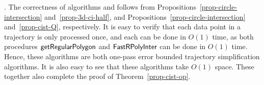 {.
%
The correctness of algorithms \cist and \cista follows from Propositions~\ref{prop-circle-intersection} and~\ref{prop-3d-ci-half}, and Propositions~\ref{prop-circle-intersection} and~\ref{prop-cist-Q}, respectively.
%
It is easy to verify that each data point in a trajectory is only processed once, and each can be done in $O(1)$ time,
as both procedures  ${\mathsf{getRegularPolygon}}$ and ${\mathsf{FastRPolyInter}}$ can be done in $O(1)$ time.
Hence, these algorithms are both one-pass error bounded trajectory simplification algorithms.
It is also easy to see that these algorithms take $O(1)$ space.
These together also complete the proof of Theorem~\ref{prop-cist-op}.

}
